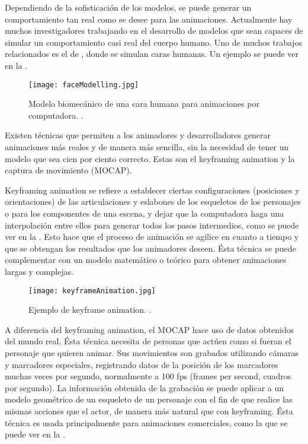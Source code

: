 Dependiendo de la sofisticación de los modelos, se puede generar un comportamiento tan real como se desee para las animaciones. Actualmente hay muchos investigadores trabajando en el desarrollo de modelos que sean capaces de simular un comportamiento casi real del cuerpo humano. Uno de muchos trabajos relacionados es el de \cite{terzopoulos:1990}, donde se simulan caras humanas. Un ejemplo se puede ver en la .

\begin{figure}[!ht]
	\centering
		\texttt{[image: faceModelling.jpg]}
	\caption[Simulación física de caras.]{Modelo biomecánico de una cara humana para animaciones por computadora. \citep{terzopoulos:1990}.}
	\label{fig:faceModelling}
\end{figure}

Existen técnicas que permiten a los animadores y desarrolladores generar animaciones más reales y de manera más sencilla, sin la necesidad de tener un modelo que sea cien por ciento correcto. Estas son el keyframing animation y la captura de movimiento (MOCAP).

Keyframing animation se refiere a establecer ciertas configuraciones (posiciones y orientaciones) de las articulaciones y eslabones de los esqueletos de los personajes o para los componentes de una escena, y dejar que la computadora haga una interpolación entre ellos para generar todos los pasos intermedios, como se puede ver en la . Esto hace que el proceso de animación se agilice en cuanto a tiempo y que se obtengan los resultados que los animadores deseen. Ésta técnica se puede complementar con un modelo matemático o teórico para obtener animaciones largas y complejas.

\begin{figure}[!ht]
	\centering
		\texttt{[image: keyframeAnimation.jpg]}
	\caption[Ejemplo de Keyframe Animation.]{Ejemplo de keyframe animation. \citep{keyframeAnimation}.}
	\label{fig:keyframeAnimation}
\end{figure}

A diferencia del keyframing animation, el MOCAP hace uso de datos obtenidos del mundo real. Ésta técnica necesita de personas que actúen como si fueran el personaje que quieren animar. Sus movimientos son grabados utilizando cámaras y marcadores especiales, registrando datos de la posición de los marcadores muchas veces por segundo, normalmente a 100 fps (frames per second, cuadros por segundo). La información obtenida de la grabación se puede aplicar a un modelo geométrico de un esqueleto de un personaje con el fin de que realice las mismas acciones que el actor, de manera más natural que con keyframing. Ésta técnica es usada principalmente para animaciones comerciales, como la que se puede ver en la .


